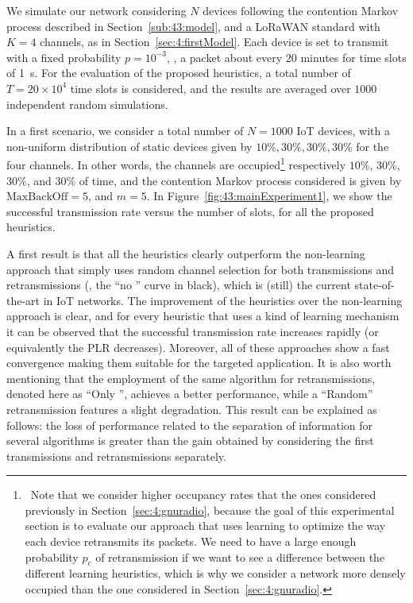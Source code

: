 We simulate our network considering $N$ devices following the contention Markov process described in Section~\ref{sub:43:model}, and a LoRaWAN standard with $K=4$ channels, as in Section~\ref{sec:4:firstModel}.
Each device is set to transmit with a fixed probability $p=10^{-3}$, \ie, a packet about every $20$ minutes for time slots of \SI{1}{\second}.
%
For the evaluation of the proposed heuristics, a total number of $T=20 \times 10^4$ time slots is considered, and the results are averaged over $1000$ independent random simulations.

In a first scenario, we consider a total number of $N=1000$ IoT devices, with a non-uniform distribution of static devices given by $10\%,30\%,30\%,30\%$ for the four channels.
In other words, the channels are occupied\footnote{~Note that we consider higher occupancy rates that the ones considered previously in Section~\ref{sec:4:gnuradio}, because the goal of this experimental section is to evaluate our approach that uses learning to optimize the way each device retransmits its packets. We need to have a large enough probability $p_c$ of retransmission if we want to see a difference between the different learning heuristics, which is why we consider a network more densely occupied than the one considered in Section~\ref{sec:4:gnuradio}.}
respectively $10\%$, $30\%$, $30\%$, and $30\%$ of time, and the contention Markov process considered is given by $\mathrm{MaxBackOff} = 5$, and $m=5$.
In Figure~\ref{fig:43:mainExperiment1}, we show the successful transmission rate versus the number of slots, for all the proposed heuristics.

A first result is that all the heuristics clearly outperform the non-learning approach that simply uses random channel selection for both transmissions and retransmissions (\ie, the ``no \UCB{}'' curve in black), which is (still) the current state-of-the-art in IoT networks.
The improvement of the heuristics over the non-learning approach is clear, and for every heuristic that uses a kind of learning mechanism it can be observed that the successful transmission rate increases rapidly (or equivalently the PLR decreases).
Moreover, all of these approaches show a fast convergence making them suitable for the targeted application.
It is also worth mentioning that the employment of the same \UCB{} algorithm for retransmissions, denoted here as ``Only \UCB{}'', achieves a better performance, while a ``Random'' retransmission features a slight degradation. This result can be explained as follows: the loss of performance related to the separation of information for several algorithms is greater than the gain obtained by considering the first transmissions and retransmissions separately.


